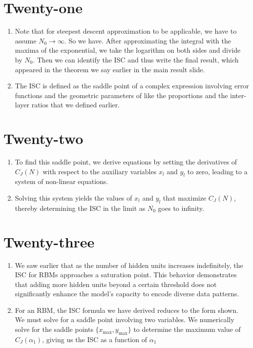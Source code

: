 \documentclass{article}
\begin{document}
\section*{Twenty-one}
\begin{enumerate}
    \item Note that for steepest descent approximation to be applicable, we have to assume \(N_{0} \to \infty\). So we have. After approximating the integral with the maxima of the exponential, we take the logarithm on both sides and divide by \(N_{0}\). Then we can identify the ISC and thus write the final result, which appeared in the theorem we say earlier in the main result slide.
    \item The ISC is defined as the saddle point of a complex expression involving error functions and the geometric parameters of like the proportions and the inter-layer ratios that we defined earlier.
\end{enumerate}

\section*{Twenty-two}
\begin{enumerate}
    \item To find this saddle point, we derive equations by setting the derivatives of \( C_J(N) \) with respect to the auxiliary variables \( x_l \) and \( y_l \) to zero, leading to a system of non-linear equations.
    \item Solving this system yields the values of \( x_l \) and \( y_l \) that maximize \( C_J(N) \), thereby determining the ISC in the limit as \( N_0 \) goes to infinity.
\end{enumerate}

\section*{Twenty-three}
\begin{enumerate}
    \item We saw earlier that as the number of hidden units increases indefinitely, the ISC for RBMs approaches a saturation point. This behavior demonstrates that adding more hidden units beyond a certain threshold does not significantly enhance the model’s capacity to encode diverse data patterns.
    \item For an RBM, the ISC formula we have derived reduces to the form shown. We must solve for a saddle point involving two variables. We numerically solve for the saddle points \(\{x_{\text{max}}, y_{\text{max}}\}\) to determine the maximum value of \(C_J(\alpha_1)\), giving us the ISC as a function of \( \alpha_1 \)
\end{enumerate}
\end{document}
